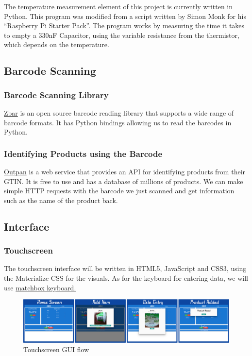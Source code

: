 \documentclass[10pt]{article}
\begin{document}
The temperature measurement element of this project is currently written in Python. This program was modified from a script written by Simon Monk for his ``Raspberry Pi Starter Pack''. The program works by measuring the time it takes to empty a 330nF Capacitor, using the variable resistance from the thermistor, which depends on the temperature. 

\subsection{Barcode Scanning}
\subsubsection{Barcode Scanning Library}

\hyperref[http://zbar.sourceforge.net/]{Zbar} is an open source barcode reading library that supports a wide range of barcode formats. It has Python bindings allowing us to read the barcodes in Python.

\subsubsection{Identifying Products using the Barcode}

\hyperref[https://www.outpan.com/]{Outpan} is a web service that provides an API for identifying products from their GTIN. It is free to use and has a database of millions of products. We can make simple HTTP requests with the barcode we just scanned and get information such as the name of the product back.

\subsection{Interface}

\subsubsection{Touchscreen}
The touchscreen interface will be written in HTML5, JavaScript and CSS3, using the Materialize CSS for the visuals. As for the keyboard for entering data, we will use \hyperref[https://github.com/xlab/matchbox-keyboard]{matchbox keyboard.}

\begin{figure}[h]
\centering
\caption{Touchscreen GUI flow}
\label{Touchscreen GUI flow}
\includegraphics[width=18cm]{images/GUI-flow.png}
\end{figure}
\end{document}
